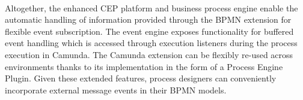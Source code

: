 \paragraph{}
Altogether, the enhanced CEP platform and business process engine enable the automatic handling of information provided through the BPMN extension for flexible event subscription.
The event engine exposes functionality for buffered event handling which is accessed through execution listeners during the process execution in Camunda.
The Camunda extension can be flexibly re-used across environments thanks to its implementation in the form of a Process Engine Plugin.
Given these extended features, process designers can conveniently incorporate external message events in their BPMN models.



